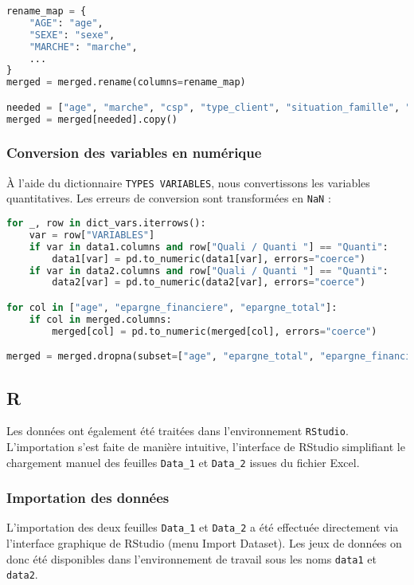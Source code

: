 \begin{lstlisting}[language=Python, caption=Renommage et sélection des variables]
rename_map = {
    "AGE": "age",
    "SEXE": "sexe",
    "MARCHE": "marche",
    ...
}
merged = merged.rename(columns=rename_map)

needed = ["age", "marche", "csp", "type_client", "situation_famille", "epargne_financiere", "epargne_total"]
merged = merged[needed].copy()
\end{lstlisting}

\subsubsection{Conversion des variables en numérique}
À l'aide du dictionnaire \texttt{TYPES VARIABLES}, nous convertissons les variables quantitatives. Les erreurs de conversion sont transformées en \texttt{NaN} :

\begin{lstlisting}[language=Python, caption=Conversion numérique et suppression des valeurs manquantes]
for _, row in dict_vars.iterrows():
    var = row["VARIABLES"]
    if var in data1.columns and row["Quali / Quanti "] == "Quanti":
        data1[var] = pd.to_numeric(data1[var], errors="coerce")
    if var in data2.columns and row["Quali / Quanti "] == "Quanti":
        data2[var] = pd.to_numeric(data2[var], errors="coerce")

for col in ["age", "epargne_financiere", "epargne_total"]:
    if col in merged.columns:
        merged[col] = pd.to_numeric(merged[col], errors="coerce")

merged = merged.dropna(subset=["age", "epargne_total", "epargne_financiere"])
\end{lstlisting}

\subsection{R}

Les données ont également été traitées dans l'environnement \texttt{RStudio}.  
L'importation s'est faite de manière intuitive, l'interface de RStudio simplifiant le chargement manuel des feuilles \texttt{Data\_1} et \texttt{Data\_2} issues du fichier Excel.  

\subsubsection{Importation des données}
L'importation des deux feuilles \texttt{Data\_1} et \texttt{Data\_2} a été effectuée directement via l'interface graphique de RStudio (menu Import Dataset).  
Les jeux de données on donc été disponibles dans l'environnement de travail sous les noms \texttt{data1} et \texttt{data2}.  

